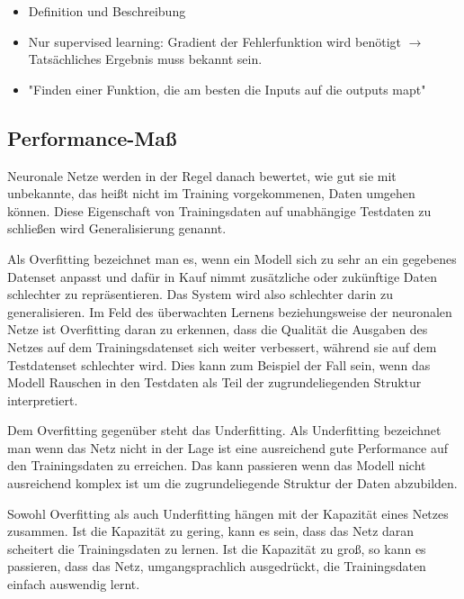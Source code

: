 \color{blue}
\begin{itemize}
	\item Definition und Beschreibung
	\item Nur supervised learning: Gradient der Fehlerfunktion wird benötigt \(\rightarrow\) Tatsächliches Ergebnis muss bekannt sein.
	\item "Finden einer Funktion, die am besten die Inputs auf die outputs mapt"
\end{itemize}
\color{black}

\subsection{Performance-Maß}

Neuronale Netze werden in der Regel danach bewertet, wie gut sie mit unbekannte, das heißt nicht im Training vorgekommenen, Daten umgehen können.
Diese Eigenschaft von Trainingsdaten auf unabhängige Testdaten zu schließen wird Generalisierung genannt. 

Als Overfitting bezeichnet man es, wenn ein Modell sich zu sehr an ein gegebenes Datenset anpasst und 
dafür in Kauf nimmt zusätzliche oder zukünftige Daten schlechter zu repräsentieren.
Das System wird also schlechter darin zu generalisieren.
Im Feld des überwachten Lernens beziehungsweise der neuronalen Netze ist Overfitting daran zu erkennen,
dass die Qualität die Ausgaben des Netzes auf dem Trainingsdatenset sich weiter verbessert,
während sie auf dem Testdatenset schlechter wird.
Dies kann zum Beispiel der Fall sein, wenn das Modell Rauschen in den Testdaten als Teil der zugrundeliegenden Struktur interpretiert. 


Dem Overfitting gegenüber steht das Underfitting. 
Als Underfitting bezeichnet man wenn das Netz nicht in der Lage ist
eine ausreichend gute Performance auf den Trainingsdaten zu erreichen.
Das kann passieren wenn das Modell nicht ausreichend komplex ist um die zugrundeliegende Struktur der Daten abzubilden.


Sowohl Overfitting als auch Underfitting hängen mit der Kapazität eines Netzes zusammen.
Ist die Kapazität zu gering, kann es sein, dass das Netz daran scheitert die Trainingsdaten zu lernen.
Ist die Kapazität zu groß, so kann es passieren, dass das Netz, umgangsprachlich ausgedrückt, die Trainingsdaten einfach auswendig lernt.

